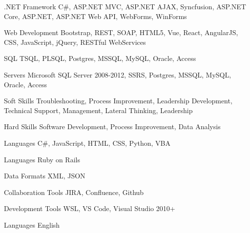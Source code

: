 


\begin{cvskills}



  \cvskill
    {.NET Framework} %
    {C\#, ASP.NET MVC, ASP.NET AJAX, Syncfusion, ASP.NET Core, ASP.NET, ASP.NET Web API, WebForms, WinForms} %


  \cvskill
    {Web Development} %
    {Bootstrap, REST, SOAP, HTML5, Vue, React, AngularJS, CSS, JavaScript, jQuery, RESTful WebServices} %


  \cvskill
    {SQL} %
    {TSQL, PLSQL, Postgres, MSSQL, MySQL, Oracle, Access} %


  \cvskill
    {Servers} %
    {Microsoft SQL Server 2008-2012, SSRS, Postgres, MSSQL, MySQL, Oracle, Access} %


  \cvskill
    {Soft Skills} %
    {Troubleshooting, Process Improvement, Leadership Development, Technical Support, Management, Lateral Thinking, Leadership} %


  \cvskill
    {Hard Skills} %
    {Software Development, Process Improvement, Data Analysis} %


  \cvskill
    {Languages} %
    {C\#, JavaScript, HTML, CSS, Python, VBA} %


  \cvskill
    {Languages} %
    {Ruby on Rails} %


  \cvskill
    {Data Formats} %
    {XML, JSON} %


  \cvskill
    {Collaboration Tools} %
    {JIRA, Confluence, Github} %


  \cvskill
    {Development Tools} %
    {WSL, VS Code, Visual Studio 2010+} %





  \cvskill
    {Languages} %
    {English} %



\end{cvskills}

